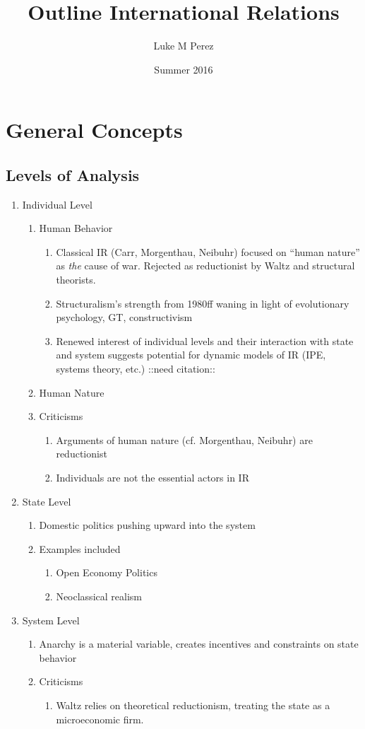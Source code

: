 \documentclass[11pt]{article}
\author{Luke M Perez}
\date{Summer 2016}
\title{Outline International Relations}
\begin{document}
\maketitle


\section{General Concepts}
\label{sec-1}
\subsection{Levels of Analysis}
\label{sec-1-1}
\begin{enumerate}
\item Individual Level
\begin{enumerate}
\item Human Behavior
\begin{enumerate}
\item Classical IR (Carr, Morgenthau, Neibuhr) focused on ``human
nature'' as \emph{the} cause of war. Rejected as reductionist by
Waltz and structural theorists.
\item Structuralism's strength from 1980ff waning in light of
evolutionary psychology, GT, constructivism
\item Renewed interest of individual levels and their interaction
with state and system suggests potential for dynamic models
of IR (IPE, systems theory, etc.) ::need citation::
\end{enumerate}
\item Human Nature
\item Criticisms
\begin{enumerate}
\item Arguments of human nature (cf. Morgenthau, Neibuhr) are
reductionist
\item Individuals are not the essential actors in IR
\end{enumerate}
\end{enumerate}
\item State Level
\begin{enumerate}
\item Domestic politics pushing upward into the system
\item Examples included
\begin{enumerate}
\item Open Economy Politics
\item Neoclassical realism
\end{enumerate}
\end{enumerate}

\item System Level
\begin{enumerate}
\item Anarchy is a material variable, creates incentives and
constraints on state behavior
\item Criticisms
\begin{enumerate}
\item Waltz relies on theoretical reductionism, treating the state
as a microeconomic firm.
\end{enumerate}
\end{enumerate}
\end{enumerate}
\end{document}

